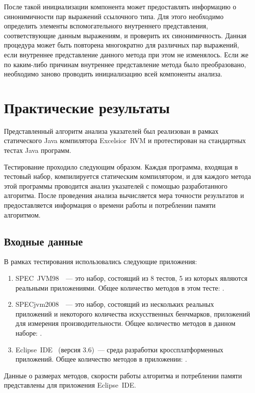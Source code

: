 \documentclass[14pt,titlepage]{extarticle}
\newcommand{\num}[1]{\numprint{#1}}
\newcommand{\eng}[1]{{\English#1}}
\let\oldsection\section
\renewcommand{\section}{\newpage\oldsection}
\newcommand{\java}{\eng{Java}\xspace}
\begin{document}
      После такой инициализации компонента может предоставлять информацию о
      синонимичности пар выражений ссылочного типа. Для этого необходимо
      определить элементы вспомогательного внутреннего представления,
      соответствующие данным выражениям, и проверить их синонимичность.
      Данная процедура может быть повторена многократно для
      различных пар выражений, если внутреннее представление данного метода при
      этом не изменялось. Если же по каким-либо причинам внутреннее
      представление метода было преобразовано, необходимо заново проводить
      инициализацию всей компоненты анализа.

  \section{Практические результаты}

    Представленный алгоритм анализа указателей был реализован в рамках
    статического \java компилятора \eng{Excelsior~RVM} и протестирован на
    стандартных тестах \java программ.

    Тестирование проходило следующим образом. Каждая программа, входящая в
    тестовый набор, компилируется статическим компилятором, и для каждого
    метода этой программы проводится анализ указателей с помощью разработанного
    алгоритма.
    После проведения анализа вычисляется мера точности результатов и
    предоставляется информация о времени работы и потреблении памяти
    алгоритмом.

    \subsection{Входные данные}

      В рамках тестирования использовались следующие приложения:
      \begin{enumerate}
        \item \eng{SPEC~JVM98}~\cite{spec_jvm98}~--- это набор, состоящий из 8
              тестов, 5 из которых являются реальными приложениями. Общее
              количество методов в этом тесте: \num{3701}.
        \item \eng{SPECjvm2008}~\cite{spec_jvm2008}~--- это набор, состоящий из
              нескольких реальных приложений и некоторого количества
              искусственных бенчмарков, приложений для измерения
              производительности.
              Общее количество методов в данном наборе: \num{37931}.
        \item \eng{Eclipse~IDE}~\cite{eclipse} (версия 3.6)~--- среда
              разработки кроссплатформенных приложений.
              Общее количество методов в приложении: \num{263802}.
      \end{enumerate}
      Данные о размерах методов, скорости работы алгоритма и потреблении памяти
      представлены для приложения \eng{Eclipse~IDE}.
\end{document}
